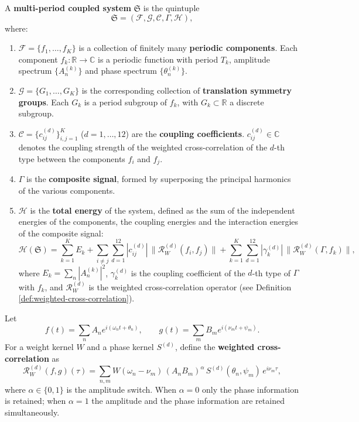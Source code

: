 \begin{definition}\label{def:periodic-system}
A \textbf{multi-period coupled system} $\mathfrak{S}$ is the quintuple
\[
\mathfrak{S}=(\mathcal{F},\mathcal{G},\mathcal{C},\Gamma,\mathcal{H}),
\]
where:
\begin{enumerate}[label=(\roman*)]
    \item $\mathcal{F}=\{f_1,\dots,f_K\}$ is a collection of finitely many \textbf{periodic components}. Each component $f_k:\mathbb{R}\to\mathbb{C}$ is a periodic function with period $T_k$, amplitude spectrum $\{A_n^{(k)}\}$ and phase spectrum $\{\theta_n^{(k)}\}$.
    \item $\mathcal{G}=\{G_1,\dots,G_K\}$ is the corresponding collection of \textbf{translation symmetry groups}. Each $G_k$ is a period subgroup of $f_k$, with $G_k\subset\mathbb{R}$ a discrete subgroup.
    \item $\mathcal{C}=\{c_{ij}^{(d)}\}_{i,j=1}^{K}$ ($d=1,\dots,12$) are the \textbf{coupling coefficients}. $c_{ij}^{(d)}\in\mathbb{C}$ denotes the coupling strength of the weighted cross-correlation of the $d$-th type between the components $f_i$ and $f_j$.
    \item $\Gamma$ is the \textbf{composite signal}, formed by superposing the principal harmonics of the various components.
    \item $\mathcal{H}$ is the \textbf{total energy} of the system, defined as the sum of the independent energies of the components, the coupling energies and the interaction energies of the composite signal:
    \[
    \mathcal{H}(\mathfrak{S})
    =\sum_{k=1}^{K}E_k
    +\sum_{i\neq j}\sum_{d=1}^{12}|c_{ij}^{(d)}|\,\bigl\|\mathcal{R}^{(d)}_{W}(f_i,f_j)\bigr\|
    +\sum_{k=1}^{K}\sum_{d=1}^{12}|\gamma_k^{(d)}|\,\bigl\|\mathcal{R}^{(d)}_{W}(\Gamma,f_k)\bigr\|,
    \]
    where $E_k=\sum_n|A_n^{(k)}|^2$, $\gamma_k^{(d)}$ is the coupling coefficient of the $d$-th type of $\Gamma$ with $f_k$, and $\mathcal{R}^{(d)}_{W}$ is the weighted cross-correlation operator (see Definition \ref{def:weighted-cross-correlation}).
\end{enumerate}
\end{definition}

\begin{definition}\label{def:weighted-cross-correlation}
Let
\[
f(t)=\sum_n A_n e^{i(\omega_n t+\theta_n)},\qquad
g(t)=\sum_m B_m e^{i(\nu_m t+\psi_m)}.
\]
For a weight kernel $W$ and a phase kernel $S^{(d)}$, define the \textbf{weighted cross-correlation} as
\[
\mathcal{R}^{(d)}_{W}(f,g)(\tau)
=\sum_{n,m}W(\omega_n-\nu_m)\,(A_nB_m)^{\alpha}\,
S^{(d)}(\theta_n,\psi_m)\,e^{i\nu_m\tau},
\]
where $\alpha\in\{0,1\}$ is the amplitude switch. When $\alpha=0$ only the phase information is retained; when $\alpha=1$ the amplitude and the phase information are retained simultaneously.
\end{definition}

